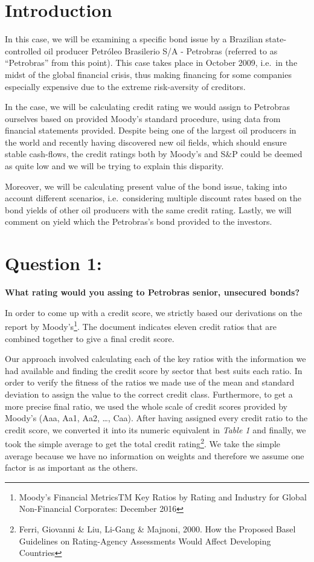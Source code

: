 \documentclass[
]{article}
\author{}
\date{\vspace{-2.5em}}
\begin{document}
\hypertarget{introduction}{%
\section{Introduction}\label{introduction}}

In this case, we will be examining a specific bond issue by a Brazilian
state-controlled oil producer Petróleo Brasilerio S/A - Petrobras
(referred to as ``Petrobras'' from this point). This case takes place in
October 2009, i.e.~in the midst of the global financial crisis, thus
making financing for some companies especially expensive due to the
extreme risk-aversity of creditors.

In the case, we will be calculating credit rating we would assign to
Petrobras ourselves based on provided Moody's standard procedure, using
data from financial statements provided. Despite being one of the
largest oil producers in the world and recently having discovered new
oil fields, which should ensure stable cash-flows, the credit ratings
both by Moody's and S\&P could be deemed as quite low and we will be
trying to explain this disparity.

Moreover, we will be calculating present value of the bond issue, taking
into account different scenarios, i.e.~considering multiple discount
rates based on the bond yields of other oil producers with the same
credit rating. Lastly, we will comment on yield which the Petrobras's
bond provided to the investors.

\hypertarget{question-1}{%
\section{Question 1:}\label{question-1}}

\textbf{What rating would you assing to Petrobras senior, unsecured
bonds?}

In order to come up with a credit score, we strictly based our
derivations on the report by Moody's\footnote{Moody's Financial
  MetricsTM Key Ratios by Rating and Industry for Global Non-Financial
  Corporates: December 2016}. The document indicates eleven credit
ratios that are combined together to give a final credit score.

Our approach involved calculating each of the key ratios with the
information we had available and finding the credit score by sector that
best suits each ratio. In order to verify the fitness of the ratios we
made use of the mean and standard deviation to assign the value to the
correct credit class. Furthermore, to get a more precise final ratio, we
used the whole scale of credit scores provided by Moody's (Aaa, Aa1,
Aa2, \ldots, Caa). After having assigned every credit ratio to the
credit score, we converted it into its numeric equivalent in \emph{Table
1} and finally, we took the simple average to get the total credit
rating\footnote{Ferri, Giovanni \& Liu, Li-Gang \& Majnoni, 2000. How
  the Proposed Basel Guidelines on Rating-Agency Assessments Would
  Affect Developing Countries}. We take the simple average because we
have no information on weights and therefore we assume one factor is as
important as the others.
\end{document}
